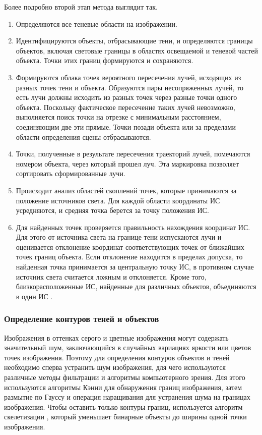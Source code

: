 Более подробно второй этап метода выглядит так.

\begin{enumerate}
	\item Определяются все теневые области на изображении.
	\item Идентифицируются объекты, отбрасывающие тени, и определяются границы объектов, включая световые границы в областях освещаемой и теневой частей объекта. Точки этих границ формируются и сохраняются.
	\item Формируются облака точек вероятного пересечения лучей, исходящих из разных точек тени и объекта. Образуются пары несопряженных лучей, то есть лучи должны исходить из разных точек через разные точки одного объекта. Поскольку фактическое пересечение таких лучей невозможно, выполняется поиск точки на отрезке с минимальным расстоянием, соединяющим две эти прямые. Точки позади объекта или за пределами области определения сцены отбрасываются. 
	\item Точки, полученные в результате пересечения траекторий лучей, помечаются номером объекта, через который прошел луч. Эта маркировка позволяет сортировать сформированные лучи.
	\item Происходит анализ областей скоплений точек, которые принимаются за положение источников света. Для каждой области координаты ИС усредняются, и средняя точка берется за точку положения ИС.
	\item Для найденных точек проверяется правильность нахождения координат ИС. Для этого от источника света на границе тени испускаются лучи и оценивается отклонение координат соответствующих точек от ближайших точек границ объекта. Если отклонение находится в пределах допуска, то найденная точка принимается за центральную точку ИС, в противном случае источник света считается ложным и отклоняется. Кроме того, близкорасположенные ИС, найденные для различных объектов, объединяются в один ИС \cite{sns_tras}.
\end{enumerate}

\subsubsection*{Определение контуров теней и объектов}

Изображения в оттенках серого и цветные изображения могут содержать значительный шум, заключающийся в случайных вариациях яркости или цветов точек изображения. Поэтому для определения контуров объектов и теней необходимо сперва устранить шум изображения, для чего используются различные методы фильтрации и алгоритмы компьютерного зрения. Для этого используются алгоритмы Кэнни \cite{canedgedetect} для обнаружения границ изображения, затем размытие по Гауссу \cite{gaus_smooth} и операция наращивания \cite{dilation} для устранения шума на границах изображения. Чтобы оставить только контуры границ, используется алгоритм скелетизации \cite{skeleton}, который уменьшает бинарные объекты до ширины одной точки изображения. 

